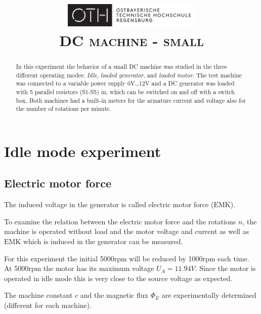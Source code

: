 \documentclass[conference]{IEEEtran}
\author{
    \IEEEauthorblockN{
        \textsc{Ayham Alhalaibi}
    }
    \and
    \IEEEauthorblockN{
        \textsc{Julia Blechle}
    }
    \and
    \IEEEauthorblockN{
        \textsc{Clara Huber}
    }
}
\begin{document}
\title{
    \centering
    \includegraphics[width=0.5\textwidth]{../OTHR_OTHR_Logo.pdf}\\
    \textsc{DC machine - small} \\
}

\maketitle

\begin{abstract}

    In this experiment the behavior of a small DC machine was studied in the
    three different operating modes: \textit{Idle}, \textit{loaded generator}, and \textit{loaded motor}.
    The test machine was connected to a variable power supply
    0\si{V}\dots12\si{V} and a DC generator was loaded with 5 parallel resistors (S1-S5) in,
     which can be switched on and off with a switch box. Both machines
    had a built-in meters for the armature current and voltage also for the
    number of rotations per minute.

\end{abstract}

\section{Idle mode experiment}
\subsection{Electric motor force}

The induced voltage in the generator is called electric motor force
($\mathrm{EMK}$).

To examine the relation between the electric motor force and the rotations $n$,
the machine is operated without load and the motor voltage and current as well
as $\mathrm{EMK}$ which is induced in the generator can be measured.

For this experiment the initial 5000rpm will be reduced by 1000rpm each
time. At 5000rpm the motor has its maximum voltage $U_A = 11.94V$.
Since the motor is operated in idle mode this is very close to the source voltage as expected.

The machine constant $c$ and the magnetic flux $\Phi_E$ are experimentally
determined (different for each machine).
\end{document}

